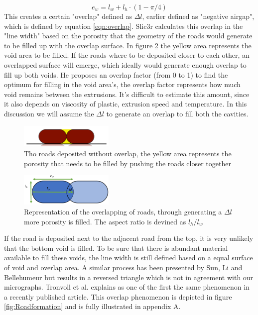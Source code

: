 \begin{equation} \label{eqn:extrudedwidth}
e_w=l_w+l_h\cdot(1-\pi/4)
\end{equation}
This creates a certain "overlap" defined as $\Delta l$, earlier defined as "negative airgap", which is defined by equation \ref{eqn:overlap}. Slic3r calculates this overlap in the "line width" based on the porosity that the geometry of the roads would generate to be filled up with the overlap surface. In figure \ref{fig:Roadoverlapslic3r} the yellow area represents the void area to be filled. If the roads where to be deposited closer to each other, an overlapped surface will emerge, which ideally would generate enough overlap to fill up both voids. He proposes an overlap factor (from 0 to 1) to find the optimum for filling in the void area's, the overlap factor represents how much void remains between the extrusions. It's difficult to estimate this amount, since it also depends on viscosity of plastic, extrusion speed and temperature. In this discussion we will assume the $\Delta l$ to generate an overlap to fill both the cavities. 

\begin{figure}[H]
    \centering
    \includegraphics[width=0.40\textwidth]{chapter_4_RVE_Definition/figures/Roadoverlapslic3r.PNG}
    \caption{Tho roads deposited without overlap, the yellow area represents the porosity that needs to be filled by pushing the roads closer together\cite{GaryHodgsonSlic3rMath}}
    \label{fig:Roadoverlapslic3r}
\end{figure}

\begin{figure}[H]
    \centering
    \includegraphics[width=0.40\textwidth]{chapter_4_RVE_Definition/figures/overlapping.PNG}
    \caption{Representation of the overlapping of roads, through generating a $\Delta l$ more porosity is filled. The aspect ratio is devined as $l_h/l_w$ }
    \label{fig:Roadoverlapslic3r}
\end{figure}

If the road is deposited next to the adjacent road from the top, it is very unlikely that the bottom void is filled. To be sure that there is abundant material available to fill these voids, the line width is still defined based on a equal surface of void and overlap area. A similar process has been presented by Sun, Li and Bellehumeur \cite{Li2002CompositeProperties} but results in a reversed triangle which is not in agreement with our micrographs. Tronvoll et al. \cite{TronvollTheApproach} explains as one of the first the same phenomenon in a recently published article. This overlap phenomenon is depicted in figure \ref{fig:Roadformation} and is fully illustrated in appendix A.


